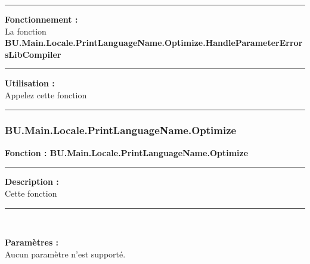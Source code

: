 \documentclass[a4paper,10pt]{article}
\begin{document}
    \par\noindent\rule{\textwidth}{0.4pt}

    \begin{justify}
        \textbf{Fonctionnement :}\\[1\baselineskip]
        La fonction \textbf{\color{func}BU.Main.Locale.PrintLanguageName.Optimize.HandleParameterErrorsLibCompiler}
    \end{justify}


    \par\noindent\rule{\textwidth}{0.4pt}

    \begin{justify}
        \textbf{Utilisation :}\\[1\baselineskip]
        Appelez cette fonction
    \end{justify}



    \color{sec3}\par\noindent\rule{\textwidth}{0.4pt}\color{text}\setlength{\parskip}{1em}

    \color{sec3}
    \subsubsection{BU.Main.Locale.PrintLanguageName.Optimize}\color{text}

    \textbf{Fonction : \color{func}BU.Main.Locale.PrintLanguageName.Optimize}\setlength{\parskip}{1em}


    \par\noindent\rule{\textwidth}{0.4pt}

    \begin{justify}
        \textbf{Description :}\\[1\baselineskip]
        Cette fonction
    \end{justify}


    \par\noindent\rule{\textwidth}{0.4pt}\\

    \begin{justify}
        \textbf{Paramètres :}\\[1\baselineskip]
        Aucun paramètre n'est supporté.
    \end{justify}
\end{document}
